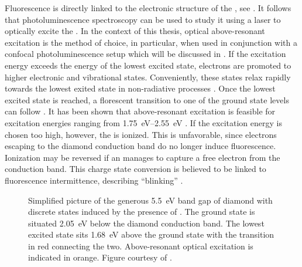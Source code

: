     Fluorescence is directly linked to the electronic structure of the \siv, see . It follows that photoluminescence spectroscopy can be used to study it using a laser to optically excite the \siv. In the context of this thesis, optical above-resonant excitation is the method of choice, in particular, when used in conjunction with a confocal photoluminescence setup which will be discussed in .
    If the excitation energy exceeds the energy of the lowest excited state, electrons are promoted to higher electronic and vibrational states. Conveniently, these states relax rapidly towards the lowest exited state in non-radiative processes \cite{Gali2013}. Once the lowest excited state is reached, a florescent transition to one of the ground state levels can follow . It has been shown that above-resonant excitation is feasible for excitation energies ranging from \SIrange{1.75}{2.55}{\eV}  \cite{iakoubovskii2001optical, Iakoubovskii2000, Rossi1997}. If the excitation energy is chosen too high, however, the \siv is ionized. This is unfavorable, since electrons escaping to the diamond conduction band do no longer induce fluorescence. Ionization may be reversed if an \siv manages to capture a free electron from the conduction band. This charge state conversion is believed to be linked to fluorescence intermittence, describing ``blinking'' \sivs \cite{Muller2011, Siyushev2009}.

    \begin{figure}[htbp]
      \centering
      \caption[Band gap of \sivs hosted in diamond]{Simplified picture of the generous \SI{5.5}{\eV} band gap of diamond with discrete states induced by the presence of \sivs. The \siv ground state is situated \SI{2.05}{\eV} below the diamond conduction band. The lowest excited state sits \SI{1.68}{\eV} above the ground state with the \zpl transition in red connecting the two. Above-resonant optical excitation is indicated in orange. Figure courtesy of \cite{BeckerMasterThesis}.}
      \label{fig::above_resonant_excitation}
    \end{figure}

